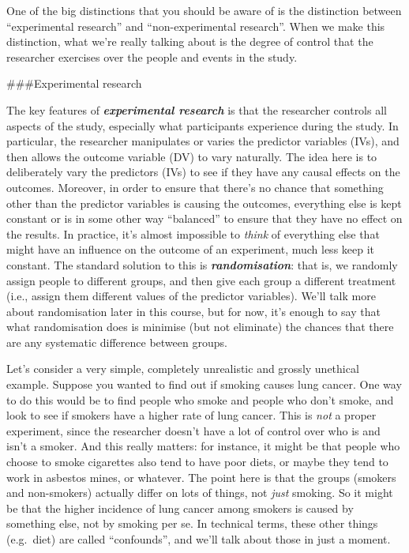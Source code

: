 \documentclass[]{book}
\begin{document}
One of the big distinctions that you should be aware of is the distinction between ``experimental research'' and ``non-experimental research''. When we make this distinction, what we're really talking about is the degree of control that the researcher exercises over the people and events in the study.

\#\#\#Experimental research

The key features of \textbf{\emph{experimental research}} is that the researcher controls all aspects of the study, especially what participants experience during the study. In particular, the researcher manipulates or varies the predictor variables (IVs), and then allows the outcome variable (DV) to vary naturally. The idea here is to deliberately vary the predictors (IVs) to see if they have any causal effects on the outcomes. Moreover, in order to ensure that there's no chance that something other than the predictor variables is causing the outcomes, everything else is kept constant or is in some other way ``balanced'' to ensure that they have no effect on the results. In practice, it's almost impossible to \emph{think} of everything else that might have an influence on the outcome of an experiment, much less keep it constant. The standard solution to this is \textbf{\emph{randomisation}}: that is, we randomly assign people to different groups, and then give each group a different treatment (i.e., assign them different values of the predictor variables). We'll talk more about randomisation later in this course, but for now, it's enough to say that what randomisation does is minimise (but not eliminate) the chances that there are any systematic difference between groups.

Let's consider a very simple, completely unrealistic and grossly unethical example. Suppose you wanted to find out if smoking causes lung cancer. One way to do this would be to find people who smoke and people who don't smoke, and look to see if smokers have a higher rate of lung cancer. This is \emph{not} a proper experiment, since the researcher doesn't have a lot of control over who is and isn't a smoker. And this really matters: for instance, it might be that people who choose to smoke cigarettes also tend to have poor diets, or maybe they tend to work in asbestos mines, or whatever. The point here is that the groups (smokers and non-smokers) actually differ on lots of things, not \emph{just} smoking. So it might be that the higher incidence of lung cancer among smokers is caused by something else, not by smoking per se. In technical terms, these other things (e.g.~diet) are called ``confounds'', and we'll talk about those in just a moment.
\end{document}
